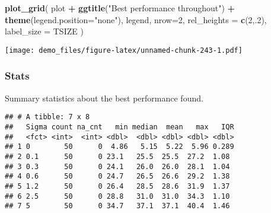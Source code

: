 \documentclass[]{book}
\newenvironment{Shaded}{\begin{snugshade}}{\end{snugshade}}
\newcommand{\DataTypeTok}[1]{\textcolor[rgb]{0.13,0.29,0.53}{#1}}
\newcommand{\DecValTok}[1]{\textcolor[rgb]{0.00,0.00,0.81}{#1}}
\newcommand{\KeywordTok}[1]{\textcolor[rgb]{0.13,0.29,0.53}{\textbf{#1}}}
\newcommand{\NormalTok}[1]{#1}
\newcommand{\OperatorTok}[1]{\textcolor[rgb]{0.81,0.36,0.00}{\textbf{#1}}}
\newcommand{\OtherTok}[1]{\textcolor[rgb]{0.56,0.35,0.01}{#1}}
\newcommand{\StringTok}[1]{\textcolor[rgb]{0.31,0.60,0.02}{#1}}
\begin{document}
\begin{Shaded}
\begin{Highlighting}[]
\KeywordTok{plot_grid}\NormalTok{(}
\NormalTok{  plot }\OperatorTok{+}
\StringTok{    }\KeywordTok{ggtitle}\NormalTok{(}\StringTok{"Best performance throughout"}\NormalTok{) }\OperatorTok{+}
\StringTok{    }\KeywordTok{theme}\NormalTok{(}\DataTypeTok{legend.position=}\StringTok{"none"}\NormalTok{),}
\NormalTok{  legend,}
  \DataTypeTok{nrow=}\DecValTok{2}\NormalTok{,}
  \DataTypeTok{rel_heights =} \KeywordTok{c}\NormalTok{(}\DecValTok{2}\NormalTok{,.}\DecValTok{2}\NormalTok{),}
  \DataTypeTok{label_size =}\NormalTok{ TSIZE}
\NormalTok{)}
\end{Highlighting}
\end{Shaded}

\texttt{[image: demo\_files/figure-latex/unnamed-chunk-243-1.pdf]}

\hypertarget{stats-46}{%
\subsubsection{Stats}\label{stats-46}}

Summary statistics about the best performance found.

\begin{Shaded}
\end{Shaded}

\begin{verbatim}
## # A tibble: 7 x 8
##   Sigma count na_cnt   min median  mean   max   IQR
##   <fct> <int>  <int> <dbl>  <dbl> <dbl> <dbl> <dbl>
## 1 0        50      0  4.86   5.15  5.22  5.96 0.289
## 2 0.1      50      0 23.1   25.5  25.5  27.2  1.08 
## 3 0.3      50      0 24.1   26.0  26.0  28.1  1.04 
## 4 0.6      50      0 24.7   26.5  26.6  29.2  1.38 
## 5 1.2      50      0 26.4   28.5  28.6  31.9  1.37 
## 6 2.5      50      0 28.8   31.0  31.0  34.3  1.10 
## 7 5        50      0 34.7   37.1  37.1  40.4  1.46
\end{verbatim}
\end{document}
